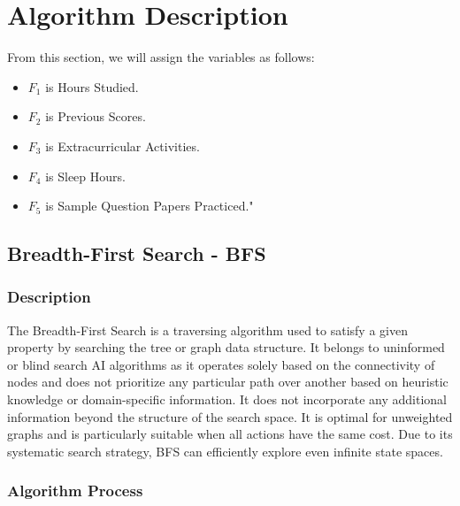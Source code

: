 \newpage

\section{Algorithm Description}
From this section, we will assign the variables as follows: 
\begin{itemize}
    \item $F_1$ is Hours Studied.
    \item $F_2$ is Previous Scores.
    \item $F_3$ is Extracurricular Activities.
    \item $F_4$ is Sleep Hours.
    \item $F_5$ is Sample Question Papers Practiced."
\end{itemize}

\subsection{Breadth-First Search - BFS}

\subsubsection*{Description}
The Breadth-First Search is a traversing algorithm used to satisfy a given property by searching the tree or graph data structure. It belongs to uninformed or blind search AI algorithms as it operates solely based on the connectivity of nodes and does not prioritize any particular path over another based on heuristic knowledge or domain-specific information. It does not incorporate any additional information beyond the structure of the search space. It is optimal for unweighted graphs and is particularly suitable when all actions have the same cost. Due to its systematic search strategy, BFS can efficiently explore even infinite state spaces.\cite{geeksforgeeks-bfs}

\subsubsection*{Algorithm Process}

